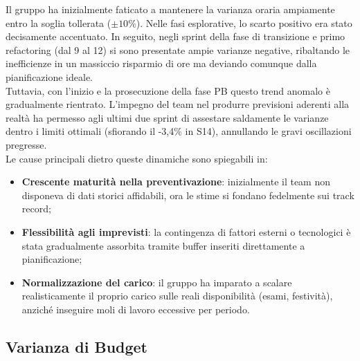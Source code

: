 \documentclass[a4paper,11pt,oneside]{scrartcl}
\begin{document}
Il gruppo ha inizialmente faticato a mantenere la varianza oraria ampiamente entro la soglia tollerata ($\pm 10\%$). Nelle fasi esplorative, lo scarto positivo era stato decisamente accentuato. In seguito, negli sprint della fase di transizione e primo refactoring (dal 9 al 12) si sono presentate ampie varianze negative, ribaltando le inefficienze in un massiccio risparmio di ore ma deviando comunque dalla pianificazione ideale.\\
Tuttavia, con l'inizio e la prosecuzione della fase PB questo trend anomalo è gradualmente rientrato. L'impegno del team nel produrre previsioni aderenti alla realtà ha permesso agli ultimi due sprint di assestare saldamente le varianze dentro i limiti ottimali (sfiorando il -3,4\% in S14), annullando le gravi oscillazioni pregresse.\\
Le cause principali dietro queste dinamiche sono spiegabili in:
\begin{itemize}
    \item \textbf{Crescente maturità nella preventivazione}: inizialmente il team non disponeva di dati storici affidabili, ora le stime si fondano fedelmente sui track record;
    \item \textbf{Flessibilità agli imprevisti}: la contingenza di fattori esterni o tecnologici è stata gradualmente assorbita tramite buffer inseriti direttamente a pianificazione;
    \item \textbf{Normalizzazione del carico}: il gruppo ha imparato a scalare realisticamente il proprio carico sulle reali disponibilità (esami, festività), anziché inseguire moli di lavoro eccessive per periodo.
\end{itemize}

\subsection{Varianza di Budget}
\end{document}
